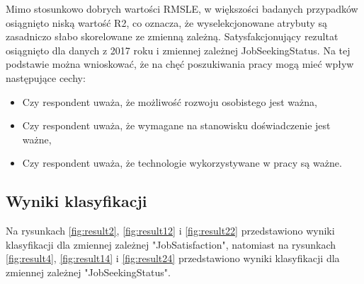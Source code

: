 Mimo stosunkowo dobrych wartości RMSLE, w większości badanych przypadków osiągnięto niską wartość R2, co oznacza, że wyselekcjonowane atrybuty są zasadniczo słabo skorelowane ze zmienną zależną.
Satysfakcjonujący rezultat osiągnięto dla danych z 2017 roku i zmiennej zależnej JobSeekingStatus.
Na tej podstawie można wnioskować, że na chęć poszukiwania pracy mogą mieć wpływ następujące cechy:

\begin{itemize}
    \item Czy respondent uważa, że możliwość rozwoju osobistego jest ważna,
    \item Czy respondent uważa, że wymagane na stanowisku doświadczenie jest ważne,
    \item Czy respondent uważa, że technologie wykorzystywane w pracy są ważne.
\end{itemize}

\subsection{Wyniki klasyfikacji}\label{sec:analysis:important-features:classification}

Na rysunkach \ref{fig:result2}, \ref{fig:result12} i \ref{fig:result22} przedstawiono wyniki klasyfikacji dla zmiennej zależnej "JobSatisfaction", natomiast na rysunkach \ref{fig:result4}, \ref{fig:result14} i \ref{fig:result24} przedstawiono wyniki klasyfikacji dla zmiennej zależnej "JobSeekingStatus".



